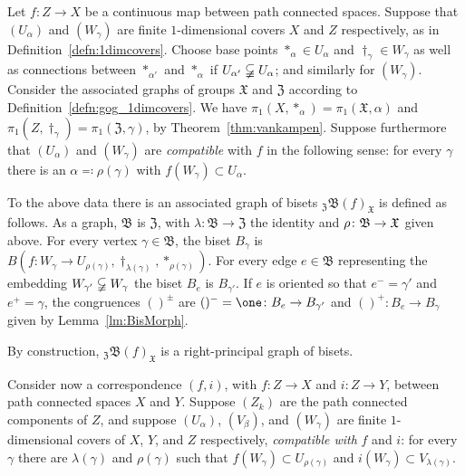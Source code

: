 \documentclass{amsart}
\begin{document}
Let $f\colon Z\to X$ be a continuous map between path connected
spaces. Suppose that $(U_{\alpha})$ and $(W_\gamma)$ are finite
$1$-dimensional covers $X$ and $Z$ respectively, as in
Definition~\ref{defn:1dimcovers}. Choose base points
$*_\alpha \in U_{\alpha}$ and $\dagger_\gamma\in W_{\gamma}$ as well
as connections between $*_{\alpha'}$ and $*_{\alpha}$ if
$U_{\alpha'}\varsubsetneqq U_{\alpha}$; and similarly for
$(W_\gamma)$. Consider the associated graphs of groups $\mathfrak X$
and $\mathfrak Z$ according to
Definition~\ref{defn:gog_1dimcovers}. We have
$\pi_1(X,*_\alpha)=\pi_1(\mathfrak X,\alpha)$ and
$\pi_1(Z,\dagger_\gamma)=\pi_1(\mathfrak Z,\gamma)$, by
Theorem~\ref{thm:vankampen}.  Suppose furthermore that $(U_{\alpha})$
and $(W_\gamma)$ are \emph{compatible} with $f$ in the following
sense: for every $\gamma$ there is an $\alpha\eqqcolon\rho(\gamma)$
with $f(W_\gamma)\subset U_\alpha$.

To the above data there is an associated graph of bisets ${}_{\mathfrak
  Z}\mathfrak B(f)_{\mathfrak X}$ is defined as follows. As a graph,
$\mathfrak B$ is $\mathfrak Z$, with $\lambda\colon\mathfrak B\to\mathfrak
Z$ the identity and $\rho\colon\mathfrak B\to{\mathfrak X}$ given above. For every
vertex $\gamma\in\mathfrak B$, the biset $B_\gamma$ is $B(f\colon
W_\gamma\to
U_{\rho(\gamma)},\dagger_{\lambda(\gamma)},*_{\rho(\gamma)})$. For every
edge $e\in \mathfrak B$ representing the embedding
$W_{\gamma'}\varsubsetneqq W_\gamma$ the biset $B_e$ is $B_{\gamma'}$. If
$e$ is oriented so that $e^-=\gamma'$ and $e^+=\gamma$, the congruences
$()^\pm$ are $()^-=\one\colon B_e\to B_{\gamma'}$ and $()^+\colon B_e\to
B_\gamma$ given by Lemma~\ref{lm:BisMorph}.
    
By construction, ${}_{\mathfrak Z}\mathfrak B(f)_{\mathfrak X}$ is a
right-principal graph of bisets.

Consider now a correspondence $(f,i)$, with $f\colon Z\to X$ and $i\colon
Z\to Y$, between path connected spaces $X$ and $Y$.  Suppose $(Z_k)$ are
the path connected components of $Z$, and suppose $(U_{\alpha})$,
$(V_\beta)$, and $(W_\gamma)$ are finite $1$-dimensional covers of $X$,
$Y$, and $Z$ respectively, \emph{compatible with} $f$ and $i$: for every
$\gamma$ there are $\lambda(\gamma)$ and $\rho(\gamma)$ such that
$f(W_\gamma)\subset U_{\rho(\gamma)}$ and $i(W_\gamma)\subset
V_{\lambda(\gamma)}$.
\end{document}
